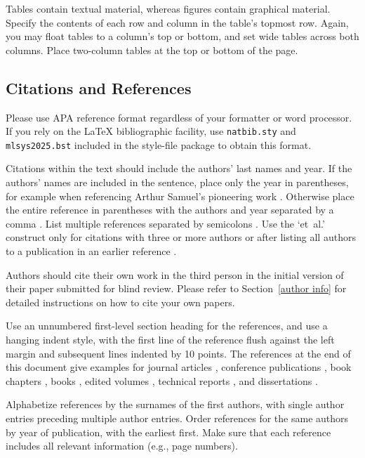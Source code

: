\documentclass{article}
\begin{document}
Tables contain textual material, whereas figures contain graphical material.
Specify the contents of each row and column in the table's topmost
row. Again, you may float tables to a column's top or bottom, and set
wide tables across both columns. Place two-column tables at the
top or bottom of the page.

\subsection{Citations and References}

Please use APA reference format regardless of your formatter
or word processor. If you rely on the \LaTeX\/ bibliographic
facility, use \texttt{natbib.sty} and \texttt{mlsys2025.bst}
included in the style-file package to obtain this format.

Citations within the text should include the authors' last names and
year. If the authors' names are included in the sentence, place only
the year in parentheses, for example when referencing Arthur Samuel's
pioneering work . Otherwise place the entire
reference in parentheses with the authors and year separated by a
comma \cite{Samuel59}. List multiple references separated by
semicolons \cite{kearns89,Samuel59,mitchell80}. Use the `et~al.'
construct only for citations with three or more authors or after
listing all authors to a publication in an earlier reference \cite{MachineLearningI}.

Authors should cite their own work in the third person
in the initial version of their paper submitted for blind review.
Please refer to Section~\ref{author info} for detailed instructions on how to
cite your own papers.

Use an unnumbered first-level section heading for the references, and use a
hanging indent style, with the first line of the reference flush against the
left margin and subsequent lines indented by 10 points. The references at the
end of this document give examples for journal articles \cite{Samuel59},
conference publications \cite{langley00}, book chapters \cite{Newell81}, books
\cite{DudaHart2nd}, edited volumes \cite{MachineLearningI}, technical reports
\cite{mitchell80}, and dissertations \cite{kearns89}.

Alphabetize references by the surnames of the first authors, with
single author entries preceding multiple author entries. Order
references for the same authors by year of publication, with the
earliest first. Make sure that each reference includes all relevant
information (e.g., page numbers).
\end{document}
